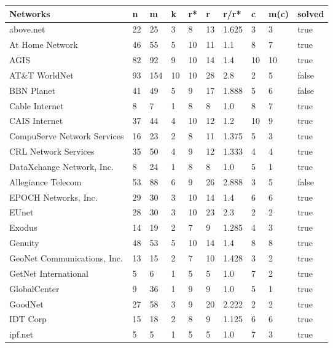 \documentclass [12pt]{article}
\begin{document}
  \begin{table}[H]
    \begin{tabular}{ | l | l | l | l | l | l | l | l | l | l | }
      \hline
      Networks & n & m &k & r* & r & r/r* & c & m(c) & solved \\ \hline
      above.net & 22 & 25 & 3 & 8 & 13 & 1.625 & 3 & 3 & true\\ \hline
      At Home Network & 46 & 55 & 5 & 10 & 11 & 1.1 & 8 & 7 & true\\ \hline
      AGIS & 82 & 92 & 9 & 10 & 14 & 1.4 & 10 & 10 & true\\ \hline
      AT\&T WorldNet & 93 & 154 & 10 & 10 & 28 & 2.8 & 2 & 5 & false\\ \hline
      BBN Planet & 41 & 49 & 5 & 9 & 17 & 1.888 & 5 & 6 & false\\ \hline
      Cable Internet & 8 & 7 & 1 & 8 & 8 & 1.0 & 8 & 7 & true\\ \hline
      CAIS Internet & 37 & 44 & 4 & 10 & 12 & 1.2 & 10 & 9 & true\\ \hline
      CompuServe Network Services & 16 & 23 & 2 & 8 & 11 & 1.375 & 5 & 3 & true\\ \hline
      CRL Network Services & 35 & 50 & 4 & 9 & 12 & 1.333 & 4 & 4 & true\\ \hline
      DataXchange Network, Inc. & 8 & 24 & 1 & 8 & 8 & 1.0 & 5 & 1 & true\\ \hline
      Allegiance Telecom & 53 & 88 & 6 & 9 & 26 & 2.888 & 3 & 5 & false\\ \hline
      EPOCH Networks, Inc. & 29 & 30 & 3 & 10 & 14 & 1.4 & 6 & 6 & true\\ \hline
      EUnet & 28 & 30 & 3 & 10 & 23 & 2.3 & 2 & 2 & true\\ \hline
      Exodus & 14 & 19 & 2 & 7 & 9 & 1.285 & 4 & 3 & true\\ \hline
      Genuity & 48 & 53 & 5 & 10 & 14 & 1.4 & 8 & 8 & true\\ \hline
      GeoNet Communications, Inc. & 13 & 15 & 2 & 7 & 10 & 1.428 & 3 & 2 & true\\ \hline
      GetNet International & 5 & 6 & 1 & 5 & 5 & 1.0 & 7 & 2 & true\\ \hline
      GlobalCenter & 9 & 36 & 1 & 9 & 9 & 1.0 & 5 & 1 & true\\ \hline
      GoodNet & 27 & 58 & 3 & 9 & 20 & 2.222 & 2 & 2 & true\\ \hline
      IDT Corp & 15 & 18 & 2 & 8 & 9 & 1.125 & 6 & 6 & true\\ \hline
      ipf.net & 5 & 5 & 1 & 5 & 5 & 1.0 & 7 & 3 & true\\ \hline

\end{tabular}
\end{table}
\end{document}
